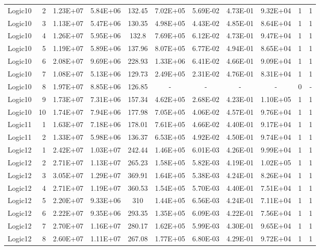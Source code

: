 \begin{longtable}{@{}l!{\vrule}r!{\vrule}c!{\vrule}c!{\vrule}c!{\vrule}c!{\vrule}c!{\vrule}c!{\vrule}c!{\vrule}c!{\vrule}c@{}}
Logic10 & 2 & 1.23E+07 & 5.84E+06 & 132.45 & 7.02E+05 & 5.69E-02 & 4.73E-01 & 9.32E+04 & 1 & 1 \\
Logic10 & 3 & 1.13E+07 & 5.47E+06 & 130.35 & 4.98E+05 & 4.43E-02 & 4.85E-01 & 8.64E+04 & 1 & 1 \\
Logic10 & 4 & 1.26E+07 & 5.95E+06 & 132.8 & 7.69E+05 & 6.12E-02 & 4.73E-01 & 9.47E+04 & 1 & 1 \\
Logic10 & 5 & 1.19E+07 & 5.89E+06 & 137.96 & 8.07E+05 & 6.77E-02 & 4.94E-01 & 8.65E+04 & 1 & 1 \\
Logic10 & 6 & 2.08E+07 & 9.69E+06 & 228.93 & 1.33E+06 & 6.41E-02 & 4.66E-01 & 9.09E+04 & 1 & 1 \\
Logic10 & 7 & 1.08E+07 & 5.13E+06 & 129.73 & 2.49E+05 & 2.31E-02 & 4.76E-01 & 8.31E+04 & 1 & 1 \\
Logic10 & 8 & 1.97E+07 & 8.85E+06 & 126.85 & - & - & - & - & 0 & - \\
Logic10 & 9 & 1.73E+07 & 7.31E+06 & 157.34 & 4.62E+05 & 2.68E-02 & 4.23E-01 & 1.10E+05 & 1 & 1 \\
Logic10 & 10 & 1.74E+07 & 7.94E+06 & 177.98 & 7.05E+05 & 4.06E-02 & 4.57E-01 & 9.76E+04 & 1 & 1 \\
\hline
{}
Logic11 & 1 & 1.63E+07 & 7.18E+06 & 178.01 & 7.61E+05 & 4.66E-02 & 4.40E-01 & 9.17E+04 & 1 & 1 \\
Logic11 & 2 & 1.33E+07 & 5.98E+06 & 136.37 & 6.53E+05 & 4.92E-02 & 4.50E-01 & 9.74E+04 & 1 & 1 \\
\hline
Logic12 & 1 & 2.42E+07 & 1.03E+07 & 242.44 & 1.46E+05 & 6.01E-03 & 4.26E-01 & 9.99E+04 & 1 & 1 \\
Logic12 & 2 & 2.71E+07 & 1.13E+07 & 265.23 & 1.58E+05 & 5.82E-03 & 4.19E-01 & 1.02E+05 & 1 & 1 \\
Logic12 & 3 & 3.05E+07 & 1.29E+07 & 369.91 & 1.64E+05 & 5.38E-03 & 4.24E-01 & 8.26E+04 & 1 & 1 \\
Logic12 & 4 & 2.71E+07 & 1.19E+07 & 360.53 & 1.54E+05 & 5.70E-03 & 4.40E-01 & 7.51E+04 & 1 & 1 \\
Logic12 & 5 & 2.20E+07 & 9.33E+06 & 310 & 1.44E+05 & 6.56E-03 & 4.24E-01 & 7.11E+04 & 1 & 1 \\
Logic12 & 6 & 2.22E+07 & 9.35E+06 & 293.35 & 1.35E+05 & 6.09E-03 & 4.22E-01 & 7.56E+04 & 1 & 1 \\
Logic12 & 7 & 2.70E+07 & 1.16E+07 & 280.17 & 1.62E+05 & 5.99E-03 & 4.30E-01 & 9.65E+04 & 1 & 1 \\
Logic12 & 8 & 2.60E+07 & 1.11E+07 & 267.08 & 1.77E+05 & 6.80E-03 & 4.29E-01 & 9.72E+04 & 1 & 1 \\

\end{longtable}
